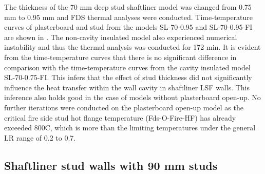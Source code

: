 The thickness of the 70 mm deep stud shaftliner model was changed from 0.75 mm to 0.95 mm and FDS thermal analyses were conducted. Time-temperature curves of plasterboard and stud from the models SL-70-0.95 and SL-70-0.95-FI are shown in . The non-cavity insulated model also experienced numerical instability and thus the thermal analysis was conducted for 172 min. It is evident from the time-temperature curves that there is no significant difference in comparison with the time-temperature curves from the cavity insulated model SL-70-0.75-FI. This infers that the effect of stud thickness did not significantly influence the heat transfer within the wall cavity in shaftliner LSF walls. This inference also holds good in the case of models without plasterboard open-up. No further iterations were conducted on the plasterboard open-up model as the critical fire side stud hot flange temperature (Fds-O-Fire-HF) has already exceeded 800\degree C, which is more than the limiting temperatures under the general LR range of 0.2 to 0.7. 

\subsection{Shaftliner stud walls with 90 mm studs}

